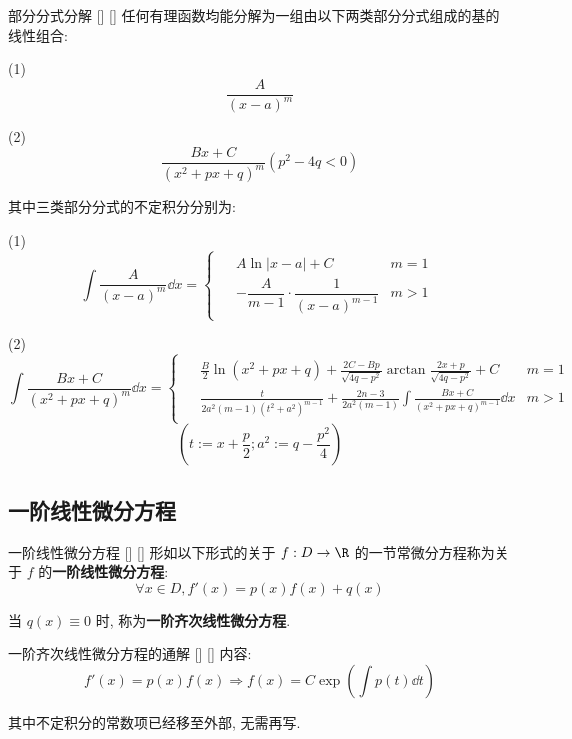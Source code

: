 \documentclass[UTF8]{ctexart}
\begin{document}
			\begin{thm}
			    []
			    {部分分式分解}
			    []
			    []
				任何有理函数均能分解为一组由以下两类部分分式组成的基的线性组合: 

                (1) \[\frac{A}{{(x-a)}^m}\]

                (2) \[\frac{Bx+C}{{(x^2+px+q)}^m}(p^2-4q<0)\]

                其中三类部分分式的不定积分分别为: 

                (1) \[\int\frac{A}{{(x-a)}^m}\dd x=
                \begin{cases}
                    \begin{aligned}
                        & A\ln|x-a|+C & m=1\\
                        & -\dfrac{A}{m-1}\cdot\dfrac{1}{{(x-a)}^{m-1}} & m>1
                    \end{aligned}
                \end{cases}\]

                (2) \[\int\frac{Bx+C}{{(x^2+px+q)}^m}\dd x=
                \begin{cases}
                    \begin{aligned}
                        & \frac{B}{2}\ln(x^2+px+q)+\frac{2C-Bp}{\sqrt{4q-p^2}}\arctan\frac{2x+p}{\sqrt{4q-p^2}}+C & m=1\\
                        & \frac{t}{2a^2(m-1){(t^2+a^2)}^{m-1}}+\frac{2n-3}{2a^2(m-1)}\int\frac{Bx+C}{{(x^2+px+q)}^{m-1}}\dd x & m>1
                    \end{aligned}
                \end{cases}\]
                \[\left(t:=x+\frac{p}{2};a^2:=q-\frac{p^2}{4}\right)\]
			\end{thm}

		\subsection{一阶线性微分方程}

			\begin{dfn}
			    []
			    {一阶线性微分方程}
			    []
			    []
				形如以下形式的关于 \(f:D\to\R\) 的一节常微分方程称为关于 \(f\) 的\textbf{一阶线性微分方程}: 
				\[\forall x\in D, f'(x)=p(x)f(x)+q(x)\]

				当 \(q(x)\equiv 0\) 时, 称为\textbf{一阶齐次线性微分方程}. 
			\end{dfn}

			\begin{thm}
			    []
			    {一阶齐次线性微分方程的通解}
			    []
			    []
				内容: 
				\[f'(x)=p(x)f(x)\Longrightarrow f(x)=C\exp(\int p(t)\dd t)\]

				其中不定积分的常数项已经移至外部, 无需再写. 
			\end{thm}
\end{document}

